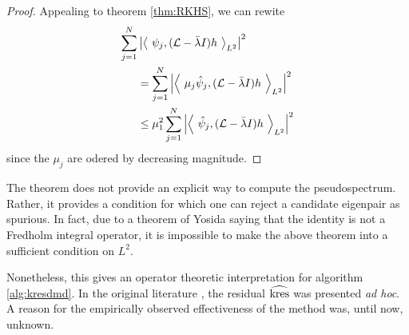 \begin{proof}
    Appealing to theorem \ref{thm:RKHS}, we can rewite
    \begin{equation}
        \begin{split}
            \sum_{j=1}^{N} & \left| \left\langle\ 
            \psi_j, (\scrL - \bar{\lambda} I) h 
        \ \right\rangle_{L^2} \right|^2 \\
        &= \sum_{j=1}^{N} \left| \left\langle\ 
            \mu_j \hat{\psi}_j, (\scrL - \bar{\lambda} I) h 
        \ \right\rangle_{L^2} \right|^2 \\
        &\leq \mu_1^2 \sum_{j=1}^{N} \left| \left\langle\ 
            \hat{\psi}_j, (\scrL - \bar{\lambda} I) h 
        \ \right\rangle_{L^2} \right|^2
        \end{split}
    \end{equation}
    since the $\mu_j$ are odered by decreasing magnitude. 
\end{proof}

The theorem does not provide an explicit way to compute the pseudospectrum. Rather, 
it provides a condition for which one can reject a candidate eigenpair as spurious. 
In fact, due to a theorem of Yosida saying that the identity is not a Fredholm integral 
operator, it is impossible to make the above theorem into a sufficient condition on $L^2$. 

Nonetheless, this gives an operator theoretic interpretation for algorithm 
\ref{alg:kresdmd}. In the original literature \cite{kresdmd}, the residual 
$\widehat{ \text{kres} }$ was presented \emph{ad hoc}. A reason for the empirically observed 
effectiveness of the method was, until now, unknown. 

